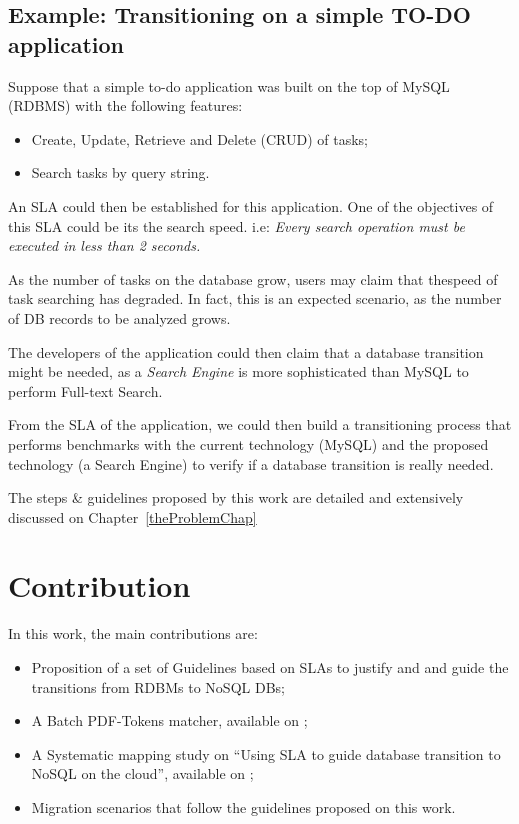 \subsection{Example: Transitioning on a simple TO-DO application}

Suppose that a simple to-do application was built on the top of MySQL (RDBMS) with the following features:

\begin{itemize}
   \item{Create, Update, Retrieve and Delete (CRUD) of tasks;}
   \item{Search tasks by query string.}
\end{itemize}

An SLA could then be established for this application. One of the objectives of this SLA could be its the search speed. i.e: \textit{Every search operation must be executed in less than 2 seconds.}

As the number of tasks on the database grow, users may claim that thespeed of task searching has degraded. In fact, this is an expected scenario, as the number of DB records to be analyzed grows.

The developers of the application could then claim that a database transition might be needed, as a \textit{Search Engine} is more sophisticated than MySQL to perform Full-text Search. 

From the SLA of the application, we could then build a transitioning process that performs benchmarks with the current technology (MySQL) and the proposed technology (a Search Engine) to verify if a database transition is really needed.

The steps \& guidelines proposed by this work are detailed and extensively discussed on Chapter~\ref{theProblemChap}

\section{Contribution}

In this work, the main contributions are: 

\begin{itemize}
   \item{Proposition of a set of Guidelines based on SLAs to justify and and guide the transitions from RDBMs to NoSQL DBs;}
   \item{A Batch PDF-Tokens matcher, available on \cite{pythonBatchPDFTokenMatcher};}
   \item{A Systematic mapping study on ``Using SLA to guide database transition to NoSQL on the cloud'', available on \cite{fabioMartinSM};}
   \item{Migration scenarios that follow the guidelines proposed on this work.}
\end{itemize}

